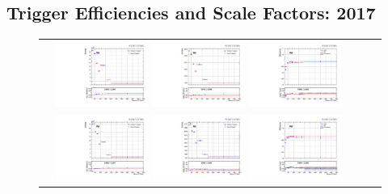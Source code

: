\clearpage
\subsection{Trigger Efficiencies and Scale Factors: 2017}
\label{TrigSFResults2017}

\begin{figure}[htb]
  \begin{center}
    \begin{tabular}{ccc}
      \includegraphics[width=0.30\textwidth]{fig_2017_TrigSF/g_lepApt_emu_MC.pdf}
      \includegraphics[width=0.30\textwidth]{fig_2017_TrigSF/g_lepApt_emu_data.pdf}
      \includegraphics[width=0.30\textwidth]{fig_2017_TrigSF/g_emu_lepApt_FullSystUncBand.pdf}\\
      \includegraphics[width=0.30\textwidth]{fig_2017_TrigSF/g_lepBpt_emu_MC.pdf}
      \includegraphics[width=0.30\textwidth]{fig_2017_TrigSF/g_lepBpt_emu_data.pdf}
      \includegraphics[width=0.30\textwidth]{fig_2017_TrigSF/g_emu_lepBpt_FullSystUncBand.pdf}\\

\end{tabular}
\end{center}
\end{figure}
